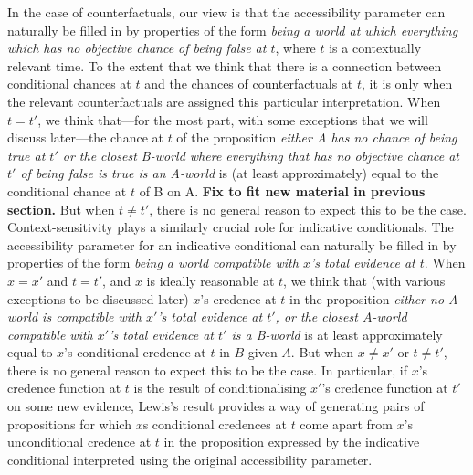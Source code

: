 \documentclass[If.tex]{subfiles}
\begin{document}
In the case of counterfactuals, our view is that the accessibility parameter can naturally be filled in by properties of the form \emph{being a world at which everything which has no objective chance of being false at $t$}, where $t$ is a contextually relevant time. To the extent that we think that there is a connection between conditional chances at $t$ and the chances of counterfactuals at $t$, it is only when the relevant counterfactuals are assigned this particular interpretation. When $t=t'$, we think that---for the most part, with some exceptions that we will discuss later---the chance at $t$ of the proposition \emph{either A has no chance of being true at $t'$ or the closest B-world where everything that has no objective chance at $t'$ of being false is true is an A-world} is (at least approximately) equal to the conditional chance at $t$ of B on A. \textbf{Fix to fit new material in previous section.}  But when $t≠t'$, there is no general reason to expect this to be the case. Context-sensitivity plays a similarly crucial role for indicative conditionals. The accessibility parameter for an indicative conditional can naturally be filled in by properties of the form \emph{being a world compatible with $x$'s total evidence at $t$}. When $x = x'$ and $t = t'$, and $x$ is ideally reasonable at $t$, we think that (with various exceptions to be discussed later) $x$'s credence at $t$ in the proposition \emph{either no A-world is compatible with $x'$'s total evidence at $t'$, or the closest $A$-world compatible with $x'$'s total evidence at $t'$ is a B-world} is at least approximately equal to $x$'s conditional credence at $t$ in $B$ given $A$. But when $x≠x'$ or $t≠t'$, there is no general reason to expect this to be the case. In particular, if $x$'s credence function at $t$ is the result of conditionalising $x'$'s credence function at $t'$ on some new evidence, Lewis's result provides a way of generating pairs of propositions for which $x$s conditional credences at $t$ come apart from $x$'s unconditional credence at $t$ in the proposition expressed by the indicative conditional interpreted using the original accessibility parameter.
\end{document}
